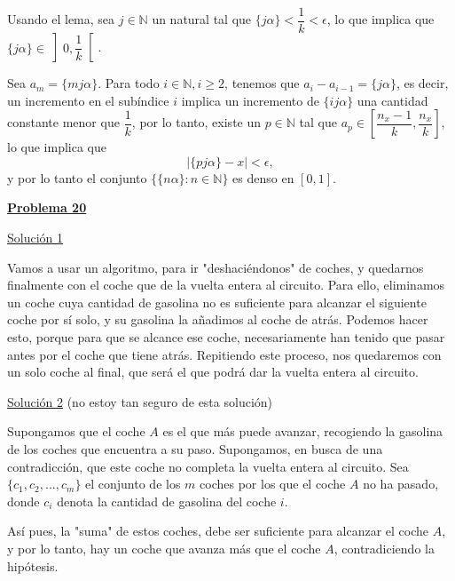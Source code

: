 \documentclass[10pt,a4paper]{article}
\begin{document}
	Usando el lema, sea $j \in \mathbb{N}$ un natural tal que $\{j \alpha\} < \dfrac{1}{k} < \epsilon$, lo que implica que $\{j \alpha \} \in \left ] 0, \dfrac{1}{k} \right [$.
	
	Sea $a_m = \{mj \alpha\}$. Para todo $i \in \mathbb{N}, i \geq 2$, tenemos que $a_i-a_{i-1} = \{j \alpha\}$, es decir, un incremento en el subíndice $i$ implica un incremento de $\{ij \alpha\}$ una cantidad constante menor que $\dfrac{1}{k}$, por lo tanto, existe un $p \in \mathbb{N}$ tal que $a_p \in \left [ \dfrac{n_x - 1}{k}, \dfrac{n_x}{k} \right ]$, lo que implica que $$ \left | \{pj\alpha\} - x \right | < \epsilon,$$ y por lo tanto el conjunto $ \{ \{n\alpha\} : n \in \mathbb{N} \}$ es denso en $[0,1]$. \newline
	
	
	\begin{flushleft}
		\textbf{\underline{Problema 20}}
	\end{flushleft}

	\underline{Solución 1}
	
	Vamos a usar un algoritmo, para ir "deshaciéndonos" de coches, y quedarnos finalmente con el coche que de la vuelta entera al circuito. Para ello, eliminamos un coche cuya cantidad de gasolina no es suficiente para alcanzar el siguiente coche por sí solo, y su gasolina la añadimos al coche de atrás. Podemos hacer esto, porque para que se alcance ese coche, necesariamente han tenido que pasar antes por el coche que tiene atrás. Repitiendo este proceso, nos quedaremos con un solo coche al final, que será el que podrá dar la vuelta entera al circuito. \newline
	
	
	\underline{Solución 2} (no estoy tan seguro de esta solución)
	
	Supongamos que el coche $A$ es el que más puede avanzar, recogiendo la gasolina de los coches que encuentra a su paso. Supongamos, en busca de una contradicción, que este coche no completa la vuelta entera al circuito. Sea $\{c_1, c_2,..., c_m\}$ el conjunto de los $m$ coches por los que el coche $A$ no ha pasado, donde $c_i$ denota la cantidad de gasolina del coche $i$. 
	
	Así pues, la "suma" de estos coches, debe ser suficiente para alcanzar el coche $A$, y por lo tanto, hay un coche que avanza más que el coche $A$, contradiciendo la hipótesis. 
	
\end{document}
